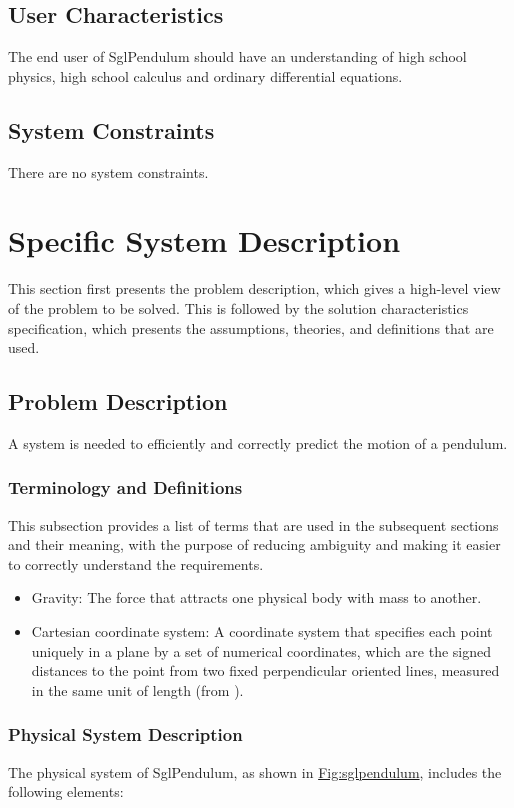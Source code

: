 \documentclass[12pt]{article}
\begin{document}
\subsection{User Characteristics}
\label{Sec:UserChars}
The end user of SglPendulum should have an understanding of high school physics, high school calculus and ordinary differential equations.

\subsection{System Constraints}
\label{Sec:SysConstraints}
There are no system constraints.

\section{Specific System Description}
\label{Sec:SpecSystDesc}
This section first presents the problem description, which gives a high-level view of the problem to be solved. This is followed by the solution characteristics specification, which presents the assumptions, theories, and definitions that are used.

\subsection{Problem Description}
\label{Sec:ProbDesc}
A system is needed to efficiently and correctly predict the motion of a pendulum.

\subsubsection{Terminology and Definitions}
\label{Sec:TermDefs}
This subsection provides a list of terms that are used in the subsequent sections and their meaning, with the purpose of reducing ambiguity and making it easier to correctly understand the requirements.

\begin{itemize}
\item{Gravity: The force that attracts one physical body with mass to another.}
\item{Cartesian coordinate system: A coordinate system that specifies each point uniquely in a plane by a set of numerical coordinates, which are the signed distances to the point from two fixed perpendicular oriented lines, measured in the same unit of length (from \cite{cartesianWiki}).}
\end{itemize}
\subsubsection{Physical System Description}
\label{Sec:PhysSyst}
The physical system of SglPendulum, as shown in \hyperref[Figure:sglpendulum]{Fig:sglpendulum}, includes the following elements:
\end{document}
